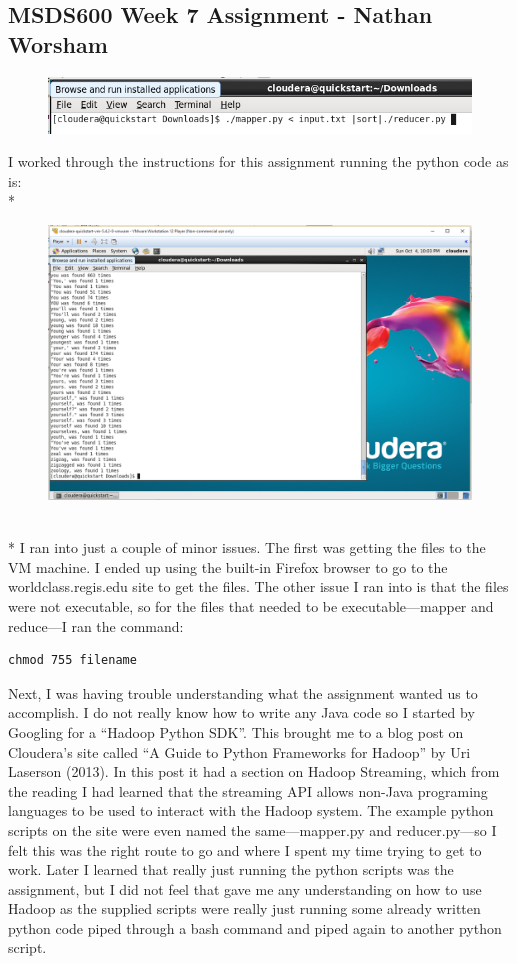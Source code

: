 \documentclass[10pt]{article}
\begin{document}
\subsection*{MSDS600 Week 7 Assignment - Nathan Worsham}
\begin{figure}[!h]
\includegraphics[scale=0.5]{reducer_command.png}
\centering
\end{figure}
\noindent I worked through the instructions for this assignment running the python code as is: \\*
\begin{figure}[!h]
\includegraphics[scale=0.3]{reducer_results.png}
\centering
\end{figure}\\*
\noindent I ran into just a couple of minor issues. The first was getting the files to the VM machine. I ended up using the built-in Firefox browser to go to the worldclass.regis.edu site to get the files. The other issue I ran into is that the files were not executable, so for the files that needed to be executable—mapper and reduce—I ran the command: 
\begin{verbatim}
chmod 755 filename 
\end{verbatim}
Next, I was having trouble understanding what the assignment wanted us to accomplish. I do not really know how to write any Java code so I started by Googling for a “Hadoop Python SDK”. This brought me to a blog post on Cloudera’s site called “A Guide to Python Frameworks for Hadoop” by Uri Laserson (2013). In this post it had a section on Hadoop Streaming, which from the reading I had learned that the streaming API allows non-Java programing languages to be used to interact with the Hadoop system. The example python scripts on the site were even named the same—mapper.py and reducer.py—so I felt this was the right route to go and where I spent my time trying to get to work. Later I learned that really just running the python scripts was the assignment, but I did not feel that gave me any understanding on how to use Hadoop as the supplied scripts were really just running some already written python code piped through a bash command and piped again to another python script.  
\end{document}
